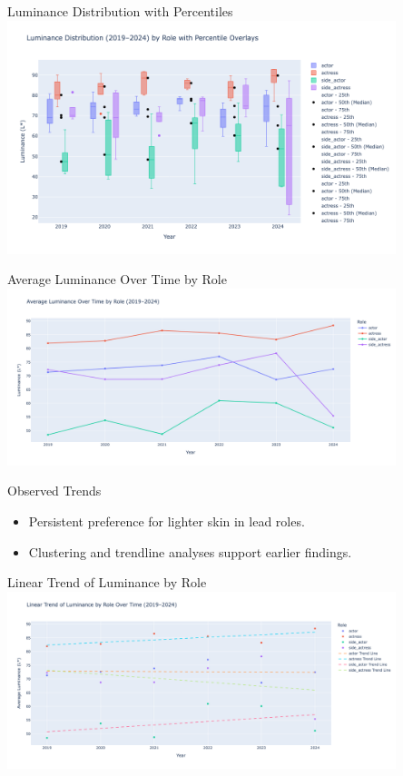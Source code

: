 \documentclass{beamer}
\begin{document}
\begin{frame}{Luminance Distribution with Percentiles}
  \centering
  \includegraphics[width=0.85\textwidth]{figures/luminance_distribution_by_role_with_percentile_overlays.png}
\end{frame}

\begin{frame}{Average Luminance Over Time by Role}
  \centering
  \includegraphics[width=0.85\textwidth]{figures/average_luminance_over_time_by_role.png}
\end{frame}

\begin{frame}{Observed Trends}
  \begin{itemize}
    \item Persistent preference for lighter skin in lead roles.
    \item Clustering and trendline analyses support earlier findings.
  \end{itemize}
\end{frame}

\begin{frame}{Linear Trend of Luminance by Role}
  \centering
  \includegraphics[width=0.85\textwidth]{figures/linear_trand_of_luminance_by_role.png}
\end{frame}
\end{document}
